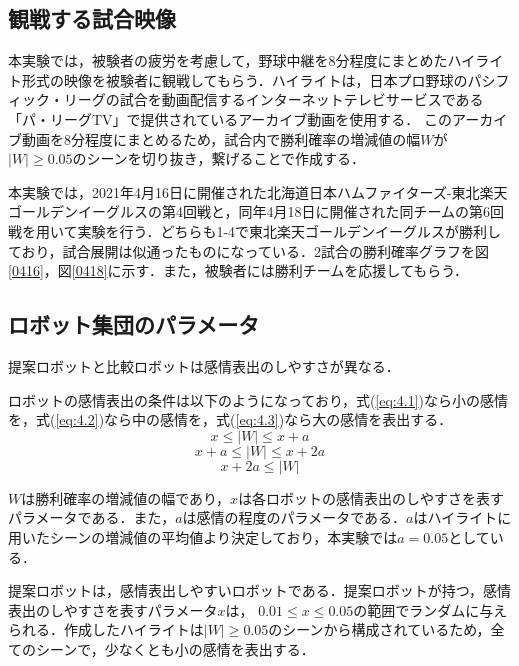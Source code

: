 \subsection{観戦する試合映像}
\label{sec4.2.1}

本実験では，被験者の疲労を考慮して，野球中継を8分程度にまとめたハイライト形式の映像を被験者に観戦してもらう．ハイライトは，日本プロ野球のパシフィック・リーグの試合を動画配信するインターネットテレビサービスである「パ・リーグTV」で提供されているアーカイブ動画を使用する\cite{patv}．
このアーカイブ動画を8分程度にまとめるため，試合内で勝利確率の増減値の幅$W$が$|W|\geq0.05$のシーンを切り抜き，繋げることで作成する．

本実験では，2021年4月16日に開催された北海道日本ハムファイターズ-東北楽天ゴールデンイーグルスの第4回戦と，同年4月18日に開催された同チームの第6回戦を用いて実験を行う．どちらも1-4で東北楽天ゴールデンイーグルスが勝利しており，試合展開は似通ったものになっている．2試合の勝利確率グラフを図\ref{0416}，図\ref{0418}に示す．また，被験者には勝利チームを応援してもらう．




\subsection{ロボット集団のパラメータ}
\label{sec4.2.2}

提案ロボットと比較ロボットは感情表出のしやすさが異なる．

ロボットの感情表出の条件は以下のようになっており，式(\ref{eq:4.1})なら小の感情を，式(\ref{eq:4.2})なら中の感情を，式(\ref{eq:4.3})なら大の感情を表出する．
\begin{equation}
\label{eq:4.1}
　x \leq |W| \leq x + a
\end{equation}
\begin{equation}
\label{eq:4.2}
　x + a \leq |W| \leq x + 2a
\end{equation}
\begin{equation}
\label{eq:4.3}
　x + 2a \leq |W| 
\end{equation}


$W$は勝利確率の増減値の幅であり，$x$は各ロボットの感情表出のしやすさを表すパラメータである．また，$a$は感情の程度のパラメータである．$a$はハイライトに用いたシーンの増減値の平均値より決定しており，本実験では$a = 0.05$としている．

提案ロボットは，感情表出しやすいロボットである．提案ロボットが持つ，感情表出のしやすさを表すパラメータ$x$は，
$0.01 \leq x \leq 0.05$の範囲でランダムに与えられる．作成したハイライトは$|W| \geq 0.05$のシーンから構成されているため，全てのシーンで，少なくとも小の感情を表出する．

